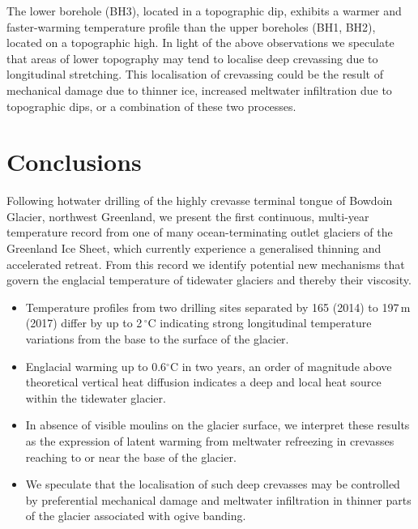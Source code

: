 \documentclass[utf8]{article}
\begin{document}
    The lower borehole (BH3), located in a topographic dip, exhibits a warmer
    and faster-warming temperature profile than the upper boreholes (BH1, BH2),
    located on a topographic high. In light of the above observations we
    speculate that areas of lower topography may tend to localise deep
    crevassing due to longitudinal stretching. This localisation of crevassing
    could be the result of mechanical damage due to thinner ice, increased
    meltwater infiltration due to topographic dips, or a combination of these
    two processes.


\section{Conclusions}

    Following hotwater drilling of the highly crevasse terminal tongue of
    Bowdoin Glacier, northwest Greenland, we present the first continuous,
    multi-year temperature record from one of many ocean-terminating outlet
    glaciers of the Greenland Ice Sheet, which currently experience a
    generalised thinning and accelerated retreat. From this record we identify
    potential new mechanisms that govern the englacial temperature of tidewater
    glaciers and thereby their viscosity.

    \begin{itemize}

      \item Temperature profiles from two drilling sites separated by 165
        (2014) to 197\,m (2017) differ by up to 2\,$^\circ$C indicating strong
        longitudinal temperature variations from the base to the surface of
        the glacier.

      \item Englacial warming up to 0.6$^\circ$C in two years, an order of
        magnitude above theoretical vertical heat diffusion indicates a deep
        and local heat source within the tidewater glacier.

      \item In absence of visible moulins on the glacier surface, we interpret
        these results as the expression of latent warming from meltwater
        refreezing in crevasses reaching to or near the base of the glacier.

      \item We speculate that the localisation of such deep crevasses may be
        controlled by preferential mechanical damage and meltwater infiltration
        in thinner parts of the glacier associated with ogive banding.

    \end{itemize}
\end{document}
